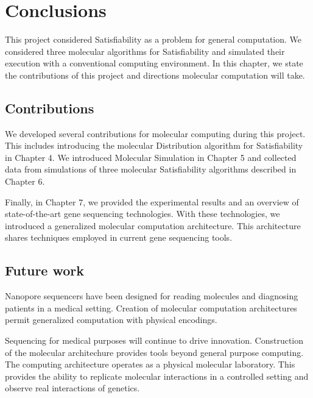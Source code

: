 \chapter{Conclusions}

This project considered {\sc Satisfiability} as a problem for general computation.  We considered three molecular algorithms for {\sc Satisfiability} and simulated their execution with a conventional computing environment.  In this chapter, we state the contributions of this project and directions molecular computation will take.
	
	\section{Contributions}

We developed several contributions for molecular computing during this project.  This includes introducing the molecular Distribution algorithm for {\sc Satisfiability} in Chapter 4.  We introduced Molecular Simulation in Chapter 5 and collected data from simulations of three molecular {\sc Satisfiability} algorithms described in Chapter 6.  

Finally, in Chapter 7, we provided the experimental results and an overview of state-of-the-art gene sequencing technologies.  With these technologies, we introduced a generalized molecular computation architecture.  This architecture shares techniques employed in current gene sequencing tools.

	\section{Future work}
	
Nanopore sequencers have been designed for reading molecules and diagnosing patients in a medical setting.  Creation of molecular computation architectures permit generalized computation with physical encodings.  

Sequencing for medical purposes will continue to drive innovation. Construction of the molecular architechure provides tools beyond general purpose computing. The computing architecture operates as a physical molecular laboratory.  This provides the ability to replicate molecular interactions in a controlled setting and observe real interactions of genetics.
		
